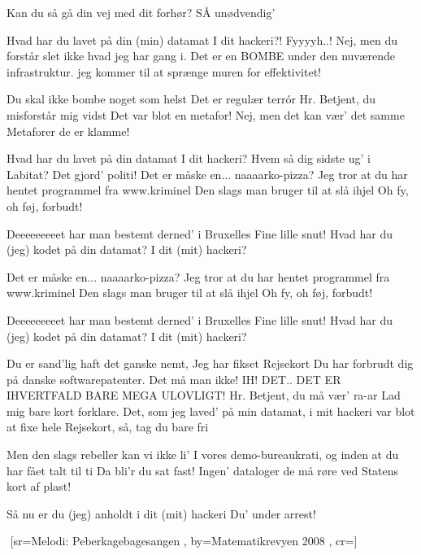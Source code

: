 \documentclass[pdftex,12pt]{article}
\begin{document}
\begin{songs}{}
Kan du så gå din vej med dit forhør?
SÅ unødvendig'

\endverse
\beginverse
Hvad har du lavet på din (min) datamat
I dit hackeri?!
Fyyyyh..!
Nej, men du forstår slet ikke hvad jeg har gang i.
Det er en BOMBE under den nuværende infrastruktur.
jeg kommer til at sprænge muren for effektivitet!

\endverse
\beginverse
Du skal ikke bombe noget som helst
Det er regulær terrór
Hr. Betjent, du misforstår mig vidst
Det var blot en metafor!
Nej, men det kan vær' det samme
Metaforer de er klamme!

\endverse
\beginverse
Hvad har du lavet på din datamat
I dit hackeri?
Hvem så dig sidste ug' i Labitat?
Det gjord' politi!
Det er måske en... naaaarko-pizza?
  Jeg tror at du har hentet programmel
  fra www.kriminel
  Den slags man bruger til at slå ihjel
  Oh fy, oh føj, forbudt!

\endverse
\beginverse
  Deeeeeeeeet har man bestemt derned' i Bruxelles
  Fine lille snut!
  Hvad har du (jeg) kodet på din datamat?
  I dit (mit) hackeri?

\endverse
\beginverse
Det er måske en... naaaarko-pizza?
  Jeg tror at du har hentet programmel
  fra www.kriminel
  Den slags man bruger til at slå ihjel
  Oh fy, oh føj, forbudt!

\endverse
\beginverse
  Deeeeeeeeet har man bestemt derned' i Bruxelles
  Fine lille snut!
  Hvad har du (jeg) kodet på din datamat?
  I dit (mit) hackeri?

\endverse
\beginverse
Du er sand'lig haft det ganske nemt,
Jeg har fikset Rejsekort
Du har forbrudt dig på danske softwarepatenter. Det må man ikke!
IH! DET.. DET ER IHVERTFALD BARE MEGA ULOVLIGT!
Hr. Betjent, du må vær' ra-ar
Lad mig bare kort forklare.
Det, som jeg laved' på min datamat,
i mit hackeri
var blot at fixe hele Rejsekort,
så, tag du bare fri

\endverse
\beginverse
Men den slags rebeller kan vi ikke li'
I vores demo-bureaukrati,
og inden at du har fået talt til ti
Da bli'r du sat fast!
Ingen' dataloger de må røre ved
Statens kort af plast!

\endverse
\beginverse
  Så nu er du (jeg) anholdt i dit (mit) hackeri
  Du' under arrest!

\endverse
\beginverse

\endverse
\endsong



﻿%
[sr={Melodi: Peberkagebagesangen}
,
by={Matematikrevyen 2008}
,
cr={}]\hypertarget{Integralsangen}{}
\label{song30}


\end{songs}
\end{document}

